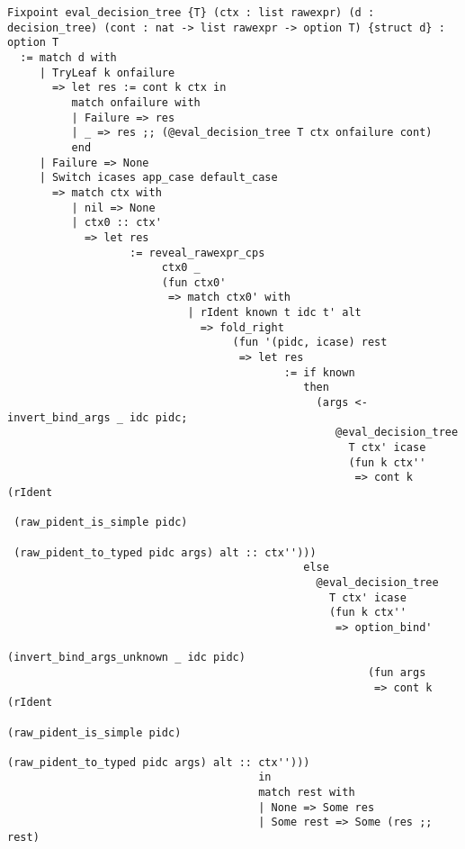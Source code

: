 \documentclass[
]{article}
\begin{document}
\begin{itemize}
\begin{itemize}
\begin{verbatim}
Fixpoint eval_decision_tree {T} (ctx : list rawexpr) (d : decision_tree) (cont : nat -> list rawexpr -> option T) {struct d} : option T
  := match d with
     | TryLeaf k onfailure
       => let res := cont k ctx in
          match onfailure with
          | Failure => res
          | _ => res ;; (@eval_decision_tree T ctx onfailure cont)
          end
     | Failure => None
     | Switch icases app_case default_case
       => match ctx with
          | nil => None
          | ctx0 :: ctx'
            => let res
                   := reveal_rawexpr_cps
                        ctx0 _
                        (fun ctx0'
                         => match ctx0' with
                            | rIdent known t idc t' alt
                              => fold_right
                                   (fun '(pidc, icase) rest
                                    => let res
                                           := if known
                                              then
                                                (args <- invert_bind_args _ idc pidc;
                                                   @eval_decision_tree
                                                     T ctx' icase
                                                     (fun k ctx''
                                                      => cont k (rIdent
                                                                   (raw_pident_is_simple pidc)
                                                                   (raw_pident_to_typed pidc args) alt :: ctx'')))
                                              else
                                                @eval_decision_tree
                                                  T ctx' icase
                                                  (fun k ctx''
                                                   => option_bind'
                                                        (invert_bind_args_unknown _ idc pidc)
                                                        (fun args
                                                         => cont k (rIdent
                                                                      (raw_pident_is_simple pidc)
                                                                      (raw_pident_to_typed pidc args) alt :: ctx'')))
                                       in
                                       match rest with
                                       | None => Some res
                                       | Some rest => Some (res ;; rest)

\end{verbatim}
\end{itemize}
\end{itemize}
\end{document}

